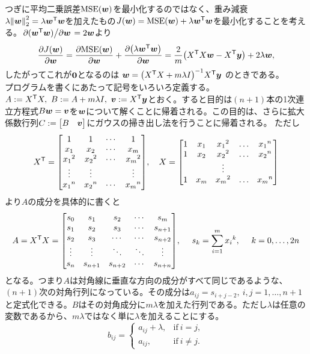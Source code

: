 \documentclass[dvipdfmx,autodetect-engine]{jsarticle}%
\begin{document}
つぎに平均二乗誤差$\mathrm{MSE}\qty(\vb*{w})$を最小化するのではなく、重み減衰$\lambda\norm{\vb*{w}}_2^2=\lambda \vb*{w}^{\mathsf{T}} \vb*{w}$を加えたもの$J(\vb*{w})=\mathrm{MSE}\qty(\vb*{w}) + \lambda \vb*{w}^{\mathsf{T}} \vb*{w}$を最小化することを考える。$\pdv*{(\vb*{w}^{\mathsf{T}} \vb*{w})}{\vb*{w}}=2\vb*{w}$より
$$\pdv{J(\vb*{w})}{\vb*{w}}=\pdv{\mathrm{MSE}(\vb*{w})}{\vb*{w}}+\pdv{\qty(\lambda \vb*{w}^{\mathsf{T}}\vb*{w} )}{\vb*{w}}= \frac{2}{m} \qty(X^\mathsf{T} X \vb*{w} - X^\mathsf{T} \vb*{y}) + 2\lambda \vb*{w},$$
したがってこれが$\vb*{0}$となるのは
$\vb*{w}=\qty(X^\mathsf{T} X +m \lambda I)^{-1} X^\mathsf{T} \vb*{y}$
のときである。\\

プログラムを書くにあたって記号をいろいろ定義する。$A:=X^{\mathsf{T}} X,~B:=A+m\lambda I,~\vb*{v}:=X^{\mathsf{T}}\vb*{y}$とおく。すると目的は$(n+1)$本の1次連立方程式$B\vb*{w}=\vb*{v}$を$\vb*{w}$について解くことに帰着される。この目的は、さらに拡大係数行列$C:=\mqty[B&\vb*{v}]$にガウスの掃き出し法を行うことに帰着される。
ただし
$$X^\T = \mqty[1 & 1 & \cdots &1 \\ x_1 & x_2 & \cdots & x_m \\ {x_1}^2 & {x_2}^2 & \cdots & {x_m}^2 \\ \vdots & \vdots & & \vdots \\ {x_1}^n & {x_2}^n & \cdots & {x_m}^n],~~~X=\mqty[ 1 & x_1 & {x_1}^2 & \ldots & {x_1}^{n} \\ 1 & x_2 & {x_2}^2 & \ldots & {x_2}^{n} \\ & & \vdots & &  \\1 & x_{m} & {x_{m}}^2 & \ldots & {x_{m}}^{n} ]$$
より$A$の成分を具体的に書くと
$$A=X^\T X = \mqty[ s_0 & s_1 & s_2 & \cdots & s_m \\ s_1 & s_2 & s_3 & \cdots & s_{n+1} \\ s_2 & s_3 & \cdots & \cdots & s_{n+2}  \\ \vdots & \vdots & \ddots & \ddots & \vdots \\ s_n & s_{n+1} & s_{n+2} & \cdots & s_{n+n}],~~~~s_k=\sum_{i=1}^{m} {x_i}^k,~~~~k=0,\ldots,2n$$
となる。つまり$A$は対角線に垂直な方向の成分がすべて同じであるような、$(n+1)$次の対角行列になっている。その成分は$a_{ij}=s_{i+j-2},~i,j=1,\ldots,n+1$と定式化できる。$B$はその対角成分に$m\lambda$を加えた行列である。ただし$\lambda$は任意の変数であるから、$m\lambda$ではなく単に$\lambda$を加えることにする。
$$b_{ij}=\left\{\begin{array}{ll}{a_{ij}+ \lambda,} & {\mathrm{if}~i=j,} \\ {a_{ij},} & {\mathrm{if}~i\neq j.}\end{array}\right.$$
\end{document}
